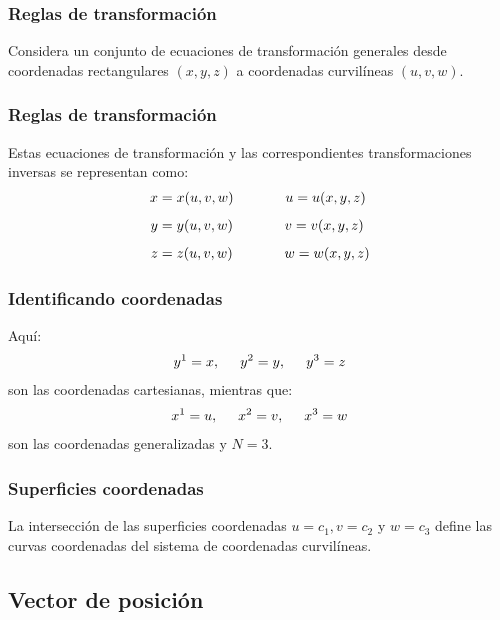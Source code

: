 \documentclass[12pt]{beamer}
\begin{document}
\begin{frame}
\frametitle{Reglas de transformación}
Considera un conjunto de ecuaciones de transformación generales desde coordenadas rectangulares $(x, y, z)$ a coordenadas curvilíneas $(u, v, w)$.
\end{frame}
\begin{frame}
\frametitle{Reglas de transformación}
Estas ecuaciones de transformación y las correspondientes transformaciones inversas se representan como:
\pause
\begin{align}
\begin{aligned}
x &= x(u, v, w) \hspace{1.3cm} u = u(x, y, z) \\[0.5em]
y &= y(u, v, w) \hspace{1.3cm} v = v(x, y, z) \\[0.5em]
z &= z(u, v, w) \hspace{1.3cm} w = w(x, y, z)
\end{aligned}
\label{eq:ecuacion_01_03_10}
\end{align}
\end{frame}
\begin{frame}
\frametitle{Identificando coordenadas}
Aquí: 
\pause
\begin{align*}
y^{1} = x, \hspace{0.5cm} y^{2} = y, \hspace{0.5cm} y^{3} = z
\end{align*}
son las coordenadas cartesianas, \pause mientras que:
\begin{align*}
x^{1} = u, \hspace{0.5cm} x^{2} = v, \hspace{0.5cm} x^{3} = w
\end{align*}
son las coordenadas generalizadas y $N = 3$.
\end{frame}
\begin{frame}
\frametitle{Superficies coordenadas}
La intersección de las superficies coordenadas $u = c_{1}, v = c_{2}$ y $w = c_{3}$ define las curvas coordenadas del sistema de coordenadas curvilíneas.
\end{frame}

\subsection{Vector de posición}
\end{document}
